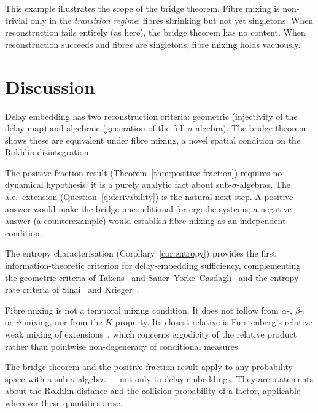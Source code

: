 \noindent This example illustrates the scope of the bridge theorem.
Fibre mixing is non-trivial only in the \emph{transition regime}:
fibres shrinking but not yet singletons.  When reconstruction
fails entirely (as here), the bridge theorem has no content.  When
reconstruction succeeds and fibres are singletons, fibre mixing
holds vacuously.

\section{Discussion}
\label{sec:discussion}

Delay embedding has two reconstruction criteria: geometric
(injectivity of the delay map) and algebraic (generation of the
full $\sigma$-algebra).  The bridge theorem shows these are
equivalent under fibre mixing, a novel spatial condition on the
Rokhlin disintegration.

The positive-fraction result
(Theorem~\ref{thm:positive-fraction}) requires no dynamical
hypothesis: it is a purely analytic fact about sub-$\sigma$-algebras.
The a.e.\ extension (Question~\ref{q:derivability}) is the natural
next step.  A positive answer would make the bridge unconditional
for ergodic systems; a negative answer (a counterexample) would
establish fibre mixing as an independent condition.

The entropy characterisation
(Corollary~\ref{cor:entropy}) provides the first
information-theoretic criterion for delay-embedding sufficiency,
complementing the geometric criteria of
Takens~\cite{Takens1981} and Sauer--Yorke--Casdagli~\cite{SauerYorkeCasdagli1991}
and the entropy-rate criteria of
Sinai~\cite{Sinai1959} and Krieger~\cite{Krieger1970}.

Fibre mixing is not a temporal mixing condition.  It does not
follow from $\alpha$-, $\beta$-, or $\psi$-mixing, nor from the
$K$-property.  Its closest relative is Furstenberg's relative weak
mixing of extensions~\cite{Furstenberg1977}, which concerns
ergodicity of the relative product rather than pointwise
non-degeneracy of conditional measures.

The bridge theorem and the positive-fraction result apply to any
probability space with a sub-$\sigma$-algebra --- not only to delay
embeddings.  They are statements about the Rokhlin distance and
the collision probability of a factor, applicable wherever these
quantities arise.



